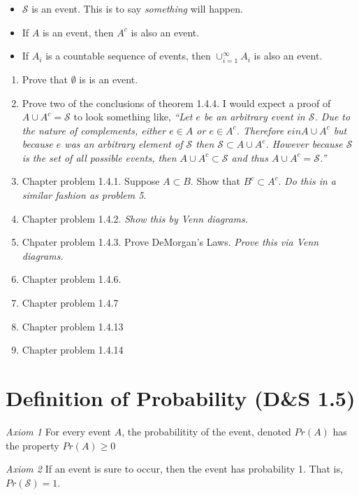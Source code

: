 \documentclass[]{book}
\providecommand{\tightlist}{%
  \setlength{\itemsep}{0pt}\setlength{\parskip}{0pt}}
\begin{document}
\begin{itemize}
\tightlist
\item
  \(\mathcal{S}\) is an event. This is to say \emph{something} will
  happen.
\item
  If \(A\) is an event, then \(A^c\) is also an event.
\item
  If \(A_i\) is a countable sequence of events, then
  \(\cup_{i=1}^\infty A_i\) is also an event.
\end{itemize}

\begin{enumerate}
\def\labelenumi{\arabic{enumi}.}
\setcounter{enumi}{3}
\item
  Prove that \(\emptyset\) is is an event.
\item
  Prove two of the conclusions of theorem 1.4.4. I would expect a proof
  of \(A \cup A^c=\mathcal{S}\) to look something like, \emph{``Let
  \(e\) be an arbitrary event in \(\mathcal{S}\). Due to the nature of
  complements, either \(e \in A\) or \(e \in A^c\). Therefore
  \(e in A \cup A^c\) but because \(e\) was an arbitrary element of
  \(\mathcal{S}\) then \(\mathcal{S} \subset A \cup A^c\). However
  because \(\mathcal{S}\) is the set of all possible events, then
  \(A \cup A^c \subset \mathcal{S}\) and thus
  \(A \cup A^c = \mathcal{S}\).''}
\item
  Chapter problem 1.4.1. Suppose \(A \subset B\). Show that
  \(B^c \subset A^c\). \emph{Do this in a similar fashion as problem 5}.
\item
  Chapter problem 1.4.2. \emph{Show this by Venn diagrams.}
\item
  Chpater problem 1.4.3. Prove DeMorgan's Laws. \emph{Prove this via
  Venn diagrams.}
\item
  Chapter problem 1.4.6.
\item
  Chapter problem 1.4.7
\item
  Chapter problem 1.4.13
\item
  Chapter problem 1.4.14
\end{enumerate}

\section{Definition of Probability (D\&S
1.5)}\label{definition-of-probability-ds-1.5}

\emph{Axiom 1} For every event \(A\), the probabilitity of the event,
denoted \(Pr(A)\) has the property \(Pr(A) \ge 0\)

\emph{Axiom 2} If an event is sure to occur, then the event has
probability 1. That is, \(Pr(\mathcal{S})=1\).
\end{document}
